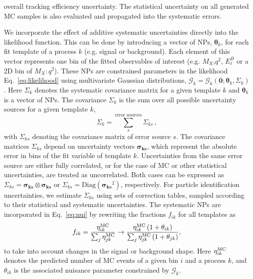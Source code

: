 \documentclass[twocolumn,aps,prd,superscriptaddress,nofootinbib,floatfix,preprintnumbers,a4]{revtex4-1}
\begin{document}
overall tracking efficiency uncertainty. The statistical uncertainty on all generated MC samples is also evaluated and propagated into the systematic errors. 


We incorporate the effect of additive systematic uncertainties directly into the likelihood function. This can be done by introducing a vector of NPs, $\boldsymbol{\theta}_k$, for each fit template of a process $k$ (e.g. signal or background). Each element of this vector represents one bin of the fitted observables of interest (e.g. $M_X$,$q^2$, $E_\ell^B$ or a 2D bin of $M_X:q^2$). These NPs are constrained parameters in the likelihood Eq.~\ref{eq:likelihood} using multivariate Gaussian distributions,  $\mathcal{G}_k = \mathcal{G}_k( \boldsymbol{0}; \boldsymbol{\theta}_k, \Sigma_k ) $. Here $\Sigma_k$ denotes the systematic covariance matrix for a given template $k$ and $\boldsymbol{\theta}_k$ is a vector of NPs. The covariance $\Sigma_k$  is the sum over all possible uncertainty sources for a given template $k$,
\begin{equation}
 \Sigma_k = \sum_{s}^{\text{error sources}} \Sigma_{ks} \, ,
\end{equation}
with $\Sigma_{ks} $ denoting the covariance matrix of error source $s$. The covariance matrices $\Sigma_{ks} $ depend on uncertainty vectors $\boldsymbol{\sigma_{ks}}$, which represent the absolute error in bins of the fit variable of template $k$. Uncertainties from the same error source are either fully correlated, or for the case of MC or other statistical uncertainties, are treated as uncorrelated. Both cases can be expressed as $\Sigma_{ks}  = \boldsymbol{\sigma_{ks}} \otimes \boldsymbol{\sigma_{ks}}$ or $\Sigma_{ks} = \text{Diag}\left( \boldsymbol{\sigma_{ks}}^2 \right)$, respectively. For particle identification uncertainties, we estimate $\Sigma_{ks} $ using sets of correction tables, sampled according to their statistical and systematic uncertainties. The systematic NPs are incorporated in Eq.~\ref{eq:nui} by rewriting the fractions $f_{ik}$ for all templates as
\begin{equation}
 f_{ik} = \frac{ \eta_{ik}^{\rm MC} }{ \sum_j \eta_{jk}^{\rm MC} } \to  \frac{ \eta_{ik}^{\rm MC} \left( 1 + \theta_{ik} \right) }{ \sum_j \eta_{jk}^{\rm MC} \left( 1 + \theta_{jk} \right)  },
\end{equation}
to take into account changes in the signal or background shape. Here $\eta_{ik}^{\rm MC}$ denotes the predicted number of MC events of a given bin $i$ and a process $k$, and $\theta_{ik}$ is the associated  nuisance parameter constrained by $\mathcal{G}_k$. 
\end{document}
